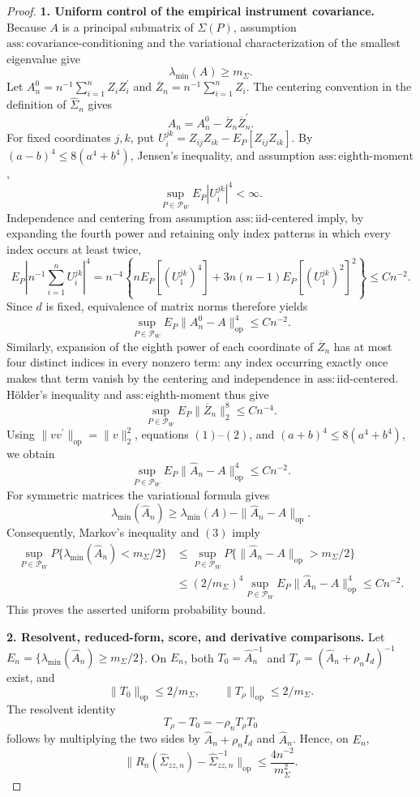 \documentclass{article}
\begin{document}
\begin{proof}
\textbf{1. Uniform control of the empirical instrument covariance.}
Because \(A\) is a principal submatrix of \(\Sigma(P)\), assumption \(\mathrm{ass:covariance\mbox{-}conditioning}\) and the variational characterization of the smallest eigenvalue give
\[
 \lambda_{\min}(A)\geq m_{\Sigma}.
\]
Let \(A_n^0=n^{-1}\sum_{i=1}^n Z_iZ_i^{\prime}\) and \(\overline Z_n=n^{-1}\sum_{i=1}^n Z_i\). The centering convention in the definition of \(\widehat\Sigma_n\) gives
\[
 \widehat A_n=A_n^0-\overline Z_n\overline Z_n^{\prime}.
\]
For fixed coordinates \(j,k\), put \(U_i^{jk}=Z_{ij}Z_{ik}-E_P[Z_{ij}Z_{ik}]\). By \((a-b)^4\leq 8(a^4+b^4)\), Jensen's inequality, and assumption \(\mathrm{ass:eighth\mbox{-}moment}\),
\[
 \sup_{P\in\mathcal P_W}E_P|U_i^{jk}|^4<\infty.
\]
Independence and centering from assumption \(\mathrm{ass:iid\mbox{-}centered}\) imply, by expanding the fourth power and retaining only index patterns in which every index occurs at least twice,
\[
 E_P\left|n^{-1}\sum_{i=1}^nU_i^{jk}\right|^4
 =n^{-4}\left\{nE_P[(U_1^{jk})^4]+3n(n-1)E_P[(U_1^{jk})^2]^2\right\}
 \leq Cn^{-2}.
\]
Since \(d\) is fixed, equivalence of matrix norms therefore yields
\[
 \sup_{P\in\mathcal P_W}E_P\|A_n^0-A\|_{\mathrm{op}}^4\leq Cn^{-2}. \tag{1}
\]
Similarly, expansion of the eighth power of each coordinate of \(\overline Z_n\) has at most four distinct indices in every nonzero term: any index occurring exactly once makes that term vanish by the centering and independence in \(\mathrm{ass:iid\mbox{-}centered}\). H\"older's inequality and \(\mathrm{ass:eighth\mbox{-}moment}\) thus give
\[
 \sup_{P\in\mathcal P_W}E_P\|\overline Z_n\|_2^8\leq Cn^{-4}. \tag{2}
\]
Using \(\|vv^{\prime}\|_{\mathrm{op}}=\|v\|_2^2\), equations \((1)\)--\((2)\), and \((a+b)^4\leq8(a^4+b^4)\), we obtain
\[
 \sup_{P\in\mathcal P_W}E_P\|\widehat A_n-A\|_{\mathrm{op}}^4\leq Cn^{-2}. \tag{3}
\]
For symmetric matrices the variational formula gives
\[
 \lambda_{\min}(\widehat A_n)
 \geq \lambda_{\min}(A)-\|\widehat A_n-A\|_{\mathrm{op}}.
\]
Consequently, Markov's inequality and \((3)\) imply
\[
 \begin{split}
 \sup_{P\in\mathcal P_W}P\{\lambda_{\min}(\widehat A_n)<m_{\Sigma}/2\}
 &\leq \sup_{P\in\mathcal P_W}P\{\|\widehat A_n-A\|_{\mathrm{op}}>m_{\Sigma}/2\}\\
 &\leq (2/m_{\Sigma})^4\sup_{P\in\mathcal P_W}E_P\|\widehat A_n-A\|_{\mathrm{op}}^4
 \leq Cn^{-2}. \tag{4}
 \end{split}
\]
This proves the asserted uniform probability bound.

\textbf{2. Resolvent, reduced-form, score, and derivative comparisons.}
Let \(E_n=\{\lambda_{\min}(\widehat A_n)\geq m_{\Sigma}/2\}\). On \(E_n\), both \(T_0=\widehat A_n^{-1}\) and \(T_{\rho}=(\widehat A_n+\rho_n I_d)^{-1}\) exist, and
\[
 \|T_0\|_{\mathrm{op}}\leq 2/m_{\Sigma},
 \qquad
 \|T_{\rho}\|_{\mathrm{op}}\leq 2/m_{\Sigma}.
\]
The resolvent identity
\[
 T_{\rho}-T_0=-\rho_nT_{\rho}T_0
\]
follows by multiplying the two sides by \(\widehat A_n+\rho_nI_d\) and \(\widehat A_n\). Hence, on \(E_n\),
\[
 \|R_n(\widehat\Sigma_{zz,n})-\widehat\Sigma_{zz,n}^{-1}\|_{\mathrm{op}}
 \leq \frac{4n^{-2}}{m_{\Sigma}^2}. \tag{5}
\]


\end{proof}
\end{document}
